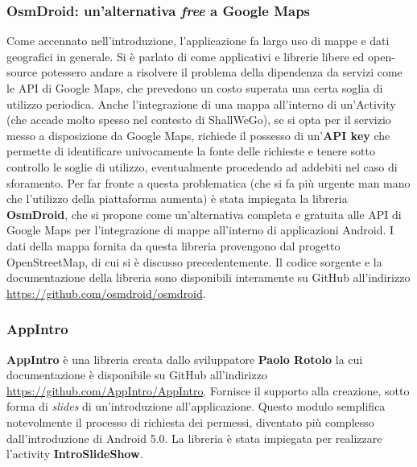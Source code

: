                 \subsubsection{OsmDroid: un'alternativa \textit{free} a Google Maps}
                    Come accennato nell'introduzione, l'applicazione fa largo uso di mappe e dati geografici in generale. Si è parlato di come applicativi e librerie libere ed open-source potessero andare a risolvere il problema della dipendenza da servizi come le API di Google Maps, che prevedono un costo superata una certa soglia di utilizzo periodica. Anche l'integrazione di una mappa all'interno di un'Activity (che accade molto spesso nel contesto di ShallWeGo), se si opta per il servizio messo a disposizione da Google Maps, richiede il possesso di un'\textbf{API key} che permette di identificare univocamente la fonte delle richieste e tenere sotto controllo le soglie di utilizzo, eventualmente procedendo ad addebiti nel caso di sforamento. Per far fronte a questa problematica (che si fa più urgente man mano che l'utilizzo della piattaforma aumenta) è stata impiegata la libreria \textbf{OsmDroid}, che si propone come un'alternativa completa e gratuita alle API di Google Maps per l'integrazione di mappe all'interno di applicazioni Android. I dati della mappa fornita da questa libreria provengono dal progetto OpenStreetMap, di cui si è discusso precedentemente. Il codice sorgente e la documentazione della libreria sono disponibili interamente su GitHub all'indirizzo \url{https://github.com/osmdroid/osmdroid}.

                \subsubsection{AppIntro}
                    \textbf{AppIntro} è una libreria creata dallo sviluppatore \textbf{Paolo Rotolo} la cui documentazione è disponibile su GitHub all'indirizzo \url{https://github.com/AppIntro/AppIntro}. Fornisce il supporto alla creazione, sotto forma di \textit{slides} di un'introduzione all'applicazione. Questo modulo semplifica notevolmente il processo di richiesta dei permessi, diventato più complesso dall'introduzione di Android 5.0.
                    La libreria è stata impiegata per realizzare l'activity \textbf{IntroSlideShow}.

